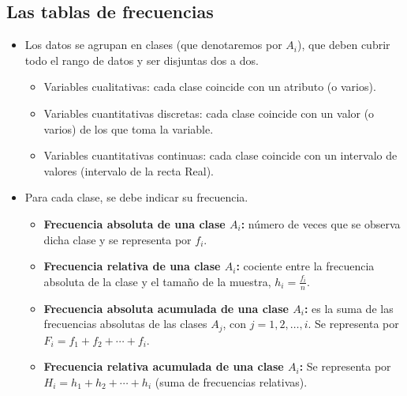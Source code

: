 \subsection{Las tablas de frecuencias}
\begin{itemize}
	\item Los datos se agrupan en clases (que denotaremos por $A_{i}$), que deben cubrir todo el rango de datos y ser disjuntas dos a dos.
	\begin{itemize}
		\item Variables cualitativas: cada clase coincide con un atributo (o varios).
		\item Variables cuantitativas discretas: cada clase coincide con un valor (o varios) de los que toma la variable.
		\item Variables cuantitativas continuas: cada clase coincide con un intervalo de valores (intervalo de la recta Real).
	\end{itemize}
	\item Para cada clase, se debe indicar su frecuencia.
	\begin{itemize}
		\item \textbf{Frecuencia absoluta de una clase $A_{i}$:} número de veces que se observa dicha clase y se representa por $f_{i}$.
		\item \textbf{Frecuencia relativa de una clase $A_{i}$:} cociente entre la frecuencia absoluta de la clase y el tamaño de la muestra, $h_{i}=\frac{f_{i}}{n}$.
		\item \textbf{Frecuencia absoluta acumulada de una clase $A_{i}$:} es la suma de las frecuencias absolutas de las clases $A_{j}$, con $j=1,2,\hdots,i$. Se representa por $F_{i}=f_{1}+f_{2}+\cdots+f_{i}$.
		\item \textbf{Frecuencia relativa acumulada de una clase $A_{i}$:} Se representa por $H_{i}=h_{1}+h_{2}+\cdots+h_{i}$ (suma de frecuencias relativas).
	\end{itemize}
\end{itemize}
